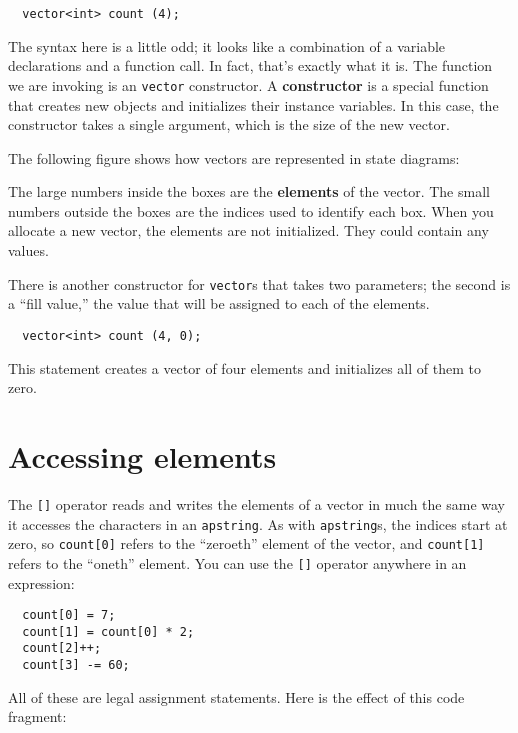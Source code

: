 \begin{verbatim}
  vector<int> count (4);
\end{verbatim}
%
The syntax here is a little odd; it looks like a combination of a
variable declarations and a function call.  In fact, that's exactly
what it is.  The function we are invoking is an {\tt vector}
constructor.  A {\bf constructor} is a special function that creates
new objects and initializes their instance variables.  In this case,
the constructor takes a single argument, which is the size of the new
vector.


The following figure shows how vectors are represented in state
diagrams:

\vspace{0.1in}
\centerline{}
\vspace{0.1in}

The large numbers inside the boxes are the {\bf elements} of
the vector.  The small numbers outside the boxes are the
indices used to identify each box.  When you allocate a new
vector, the elements are not initialized.  They could contain
any values.

There is another constructor for {\tt vector}s that takes
two parameters; the second is a ``fill value,'' the
value that will be assigned to each of the elements.

\begin{verbatim}
  vector<int> count (4, 0);
\end{verbatim}
%
This statement creates a vector of four elements and initializes
all of them to zero.

\section{Accessing elements}

The {\tt []} operator reads and writes the elements of a vector in
much the same way it accesses the characters in an {\tt apstring}.  As
with {\tt apstring}s, the indices start at zero, so {\tt count[0]}
refers to the ``zeroeth'' element of the vector, and {\tt count[1]}
refers to the ``oneth'' element.  You can use the {\tt []} operator
anywhere in an expression:

\begin{verbatim}
  count[0] = 7;
  count[1] = count[0] * 2;
  count[2]++;
  count[3] -= 60;
\end{verbatim}
%
All of these are legal assignment statements.  Here is the
effect of this code fragment:

